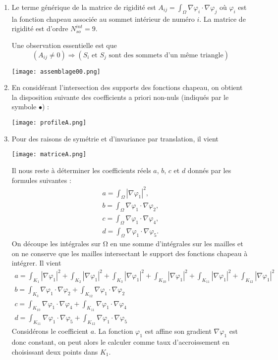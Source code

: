 \documentclass{article}
\begin{document}
\begin{enumerate}
\item Le terme générique de la matrice de rigidité est $A_{ij} =\int_{\Omega}\nabla\varphi_i\cdot\nabla\varphi_j$  où $\varphi_i$ est la fonction chapeau associée au sommet intérieur de numéro $i$. La matrice de rigidité est d'ordre $N_{so}^{int} = 9$.

Une observation essentielle est que
\[(A_{ij} \neq 0) \Longrightarrow (S_i \mbox{ et }S_j \mbox{ sont des sommets d’un même triangle})\]
\begin{center}
\texttt{[image: assemblage00.png]} 
\end{center}
\item En considérant l'intersection des supports des fonctions chapeau, on obtient la disposition suivante des coefficients a priori non-nuls (indiqués par le symbole $\bullet$) :
\begin{center}
\texttt{[image: profileA.png]} 
\end{center}
\item Pour des raisons de symétrie et d’invariance par translation, il vient
\begin{center}
\texttt{[image: matriceA.png]} 
\end{center}
Il nous reste à déterminer les coefficients réels $a$, $b$, $c$ et $d$ donnés par les formules suivantes :
\[\begin{array}{l}
\displaystyle a=\int_{\Omega}\left|\nabla\varphi_1\right|^2,\\
\displaystyle b=\int_{\Omega}\nabla\varphi_1\cdot\nabla\varphi_2,\\
\displaystyle c=\int_{\Omega}\nabla\varphi_1\cdot\nabla\varphi_4,\\
\displaystyle d=\int_{\Omega}\nabla\varphi_1\cdot\nabla\varphi_5.
\end{array}\]
On découpe les intégrales sur Ω en une somme d'intégrales sur les mailles et on ne conserve que les mailles intersectant le support des fonctions chapeau à intégrer. Il vient
\[\begin{array}{l}
\displaystyle a=\int_{K_1}\left|\nabla\varphi_1\right|^2+\int_{K_2}\left|\nabla\varphi_1\right|^2+\int_{K_3}\left|\nabla\varphi_1\right|^2+\int_{K_{10}}\left|\nabla\varphi_1\right|^2+\int_{K_{11}}\left|\nabla\varphi_1\right|^2+\int_{K_{12}}\left|\nabla\varphi_1\right|^2\\
\displaystyle b=\int_{K_3}\nabla\varphi_1\cdot\nabla\varphi_2+\int_{K_{12}}\nabla\varphi_1\cdot\nabla\varphi_2\\
\displaystyle c=\int_{K_{10}}\nabla\varphi_1\cdot\nabla\varphi_4+\int_{K_{11}}\nabla\varphi_1\cdot\nabla\varphi_4\\
\displaystyle d=\int_{K_{11}}\nabla\varphi_1\cdot\nabla\varphi_5+\int_{K_{12}}\nabla\varphi_1\cdot\nabla\varphi_5
\end{array}\]
Considérons le coefficient $a$. La fonction $\varphi_1$ est affine son gradient  $\nabla\varphi_1$ est donc constant, on peut alors le calculer comme taux d'accroissement en choisissant deux points dans $K_1$.



\end{enumerate}
\end{document}
